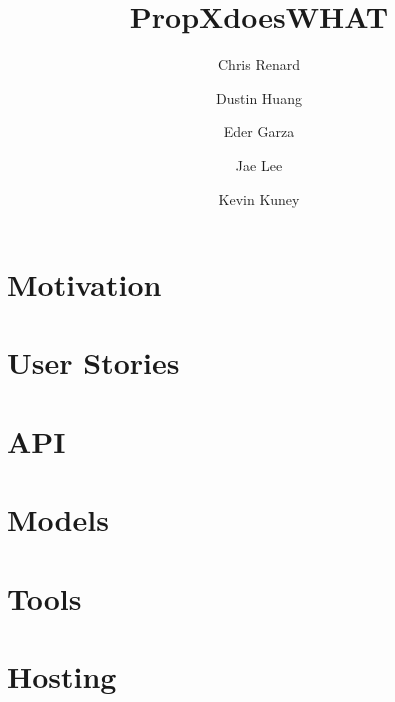 \documentclass[12pt]{article}
\title{PropXdoesWHAT}
\author{Chris Renard \and Dustin Huang \and Eder Garza \and Jae Lee \and Kevin Kuney}
\date{} %
\begin{document}
\maketitle

\section{Motivation}

\section{User Stories}

\section{API}

\section{Models}

\section{Tools}

\section{Hosting}
\end{document}
